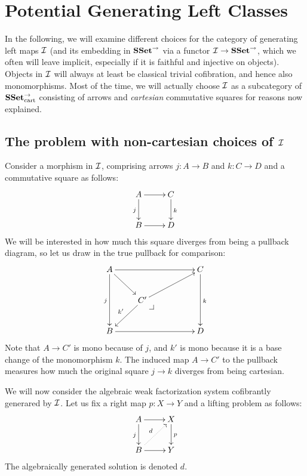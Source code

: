 \documentclass[reqno,10pt,a4paper,oneside]{amsart}
\begin{document}
\section*{Potential Generating Left Classes}

In the following, we will examine different choices for the category of generating left maps $\cal{I}$ (and its embedding in $\SSet^{\to}$ via a functor $\cal{I} \to \SSet^{\to}$, which we often will leave implicit, especially if it is faithful and injective on objects).
Objects in $\cal{I}$ will always at least be classical trivial cofibration, and hence also monomorphisms.
Most of the time, we will actually choose $\cal{I}$ as a subcategory of $\SSet_{\text{cart}}^{\to}$ consisting of arrows and \emph{cartesian} commutative squares for reasons now explained.

\subsection*{The problem with non-cartesian choices of $\cal{I}$}

Consider a morphism in $\cal{I}$, comprising arrows $j : A \to B$ and $k : C \to D$ and a commutative square as follows:
\begin{equation}
\label{eq:problem-non-cartesian-0}
\begin{gathered}
\xymatrix{
  A
  \ar[r]
  \ar[d]_{j}
&
  C
  \ar[d]^{k}
\\
  B
  \ar[r]
&
  D
}
\end{gathered}
\end{equation}
We will be interested in how much this square diverges from being a pullback diagram, so let us draw in the true pullback for comparison:
\begin{equation}
\label{eq:problem-non-cartesian-1}
\begin{gathered}
\xymatrix{
  A
  \ar[rrr]
  \ar[dd]_{j}
  \ar[dr]
&&&
  C
  \ar[dd]^{k}
\\&
  C'
  \ar[urr]
  \ar[dl]_{k'}
  \pullback{dr}
\\
  B
  \ar[rrr]
&&&
  D
}
\end{gathered}
\end{equation}
Note that $A \to C'$ is mono because of $j$, and $k'$ is mono because it is a base change of the monomorphism $k$.
The induced map $A \to C'$ to the pullback measures how much the original square $j \to k$ diverges from being cartesian.

We will now consider the algebraic weak factorization system cofibrantly generared by $\cal{I}$.
Let us fix a right map $p : X \to Y$ and a lifting problem as follows:
\[
\xymatrix{
  A
  \ar[r]
  \ar[d]_{j}
&
  X
  \ar[d]^{p}
\\
  B
  \ar[r]
  \ar@{.>}[ur]^{d}
&
  Y
}
\]
The algebraically generated solution is denoted $d$.
\end{document}
